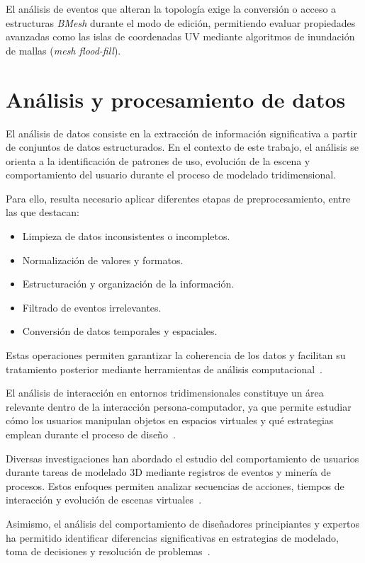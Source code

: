 El análisis de eventos que alteran la topología exige la conversión o acceso a estructuras \textit{BMesh} durante el modo de edición, permitiendo evaluar propiedades avanzadas como las islas de coordenadas UV mediante algoritmos de inundación de mallas (\textit{mesh flood-fill}).

\section{Análisis y procesamiento de datos}

El análisis de datos consiste en la extracción de información significativa a partir de conjuntos de datos estructurados. En el contexto de este trabajo, el análisis se orienta a la identificación de patrones de uso, evolución de la escena y comportamiento del usuario durante el proceso de modelado tridimensional.

Para ello, resulta necesario aplicar diferentes etapas de preprocesamiento, entre las que destacan:

\begin{itemize}
\item Limpieza de datos inconsistentes o incompletos.
\item Normalización de valores y formatos.
\item Estructuración y organización de la información.
\item Filtrado de eventos irrelevantes.
\item Conversión de datos temporales y espaciales.
\end{itemize}

Estas operaciones permiten garantizar la coherencia de los datos y facilitan su tratamiento posterior mediante herramientas de análisis computacional~\cite{data_analysis}.

El análisis de interacción en entornos tridimensionales constituye un área relevante dentro de la interacción persona-computador, ya que permite estudiar cómo los usuarios manipulan objetos en espacios virtuales y qué estrategias emplean durante el proceso de diseño~\cite{jankowski2014,lavioila2017}.

Diversas investigaciones han abordado el estudio del comportamiento de usuarios durante tareas de modelado 3D mediante registros de eventos y minería de procesos. Estos enfoques permiten analizar secuencias de acciones, tiempos de interacción y evolución de escenas virtuales~\cite{gao2021,gao2023,liu2022,xie2014}.

Asimismo, el análisis del comportamiento de diseñadores principiantes y expertos ha permitido identificar diferencias significativas en estrategias de modelado, toma de decisiones y resolución de problemas~\cite{casakin2023,chen2022,welch}.

